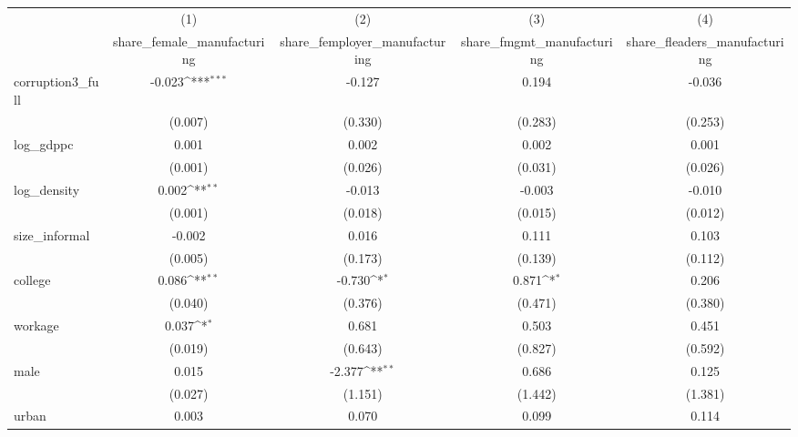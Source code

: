 {
\def\sym#1{\ifmmode^{#1}\else\(^{#1}\)\fi}
\begin{tabular}{l*{4}{c}}
\hline\hline
            &\multicolumn{1}{c}{(1)}&\multicolumn{1}{c}{(2)}&\multicolumn{1}{c}{(3)}&\multicolumn{1}{c}{(4)}\\
            &\multicolumn{1}{c}{share\_female\_manufacturing}&\multicolumn{1}{c}{share\_femployer\_manufacturing}&\multicolumn{1}{c}{share\_fmgmt\_manufacturing}&\multicolumn{1}{c}{share\_fleaders\_manufacturing}\\
\hline
corruption3\_full&      -0.023\sym{***}&      -0.127         &       0.194         &      -0.036         \\
            &     (0.007)         &     (0.330)         &     (0.283)         &     (0.253)         \\
[1em]
log\_gdppc   &       0.001         &       0.002         &       0.002         &       0.001         \\
            &     (0.001)         &     (0.026)         &     (0.031)         &     (0.026)         \\
[1em]
log\_density &       0.002\sym{**} &      -0.013         &      -0.003         &      -0.010         \\
            &     (0.001)         &     (0.018)         &     (0.015)         &     (0.012)         \\
[1em]
size\_informal&      -0.002         &       0.016         &       0.111         &       0.103         \\
            &     (0.005)         &     (0.173)         &     (0.139)         &     (0.112)         \\
[1em]
college     &       0.086\sym{**} &      -0.730\sym{*}  &       0.871\sym{*}  &       0.206         \\
            &     (0.040)         &     (0.376)         &     (0.471)         &     (0.380)         \\
[1em]
workage     &       0.037\sym{*}  &       0.681         &       0.503         &       0.451         \\
            &     (0.019)         &     (0.643)         &     (0.827)         &     (0.592)         \\
[1em]
male        &       0.015         &      -2.377\sym{**} &       0.686         &       0.125         \\
            &     (0.027)         &     (1.151)         &     (1.442)         &     (1.381)         \\
[1em]
urban       &       0.003         &       0.070         &       0.099         &       0.114         \\

\end{tabular}}
